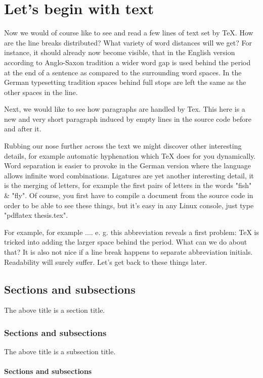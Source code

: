\chapter{Let's begin with text}%
Now we would of course like to see and read a few lines of text set by TeX. How are the line breaks distributed? What variety of word distances will we get? For instance, it should already now become visible, that in the English version according to Anglo-Saxon tradition a wider word gap is used behind the period at the end of a sentence as compared to the surrounding word spaces. In the German typesetting tradition spaces behind full stops are left the same as the other spaces in the line.

Next, we would like to see how paragraphs are handled by Tex. This here is a new and very short paragraph induced by empty lines in the source code before and after it.

Rubbing our nose further across the text we might discover other interesting details, for example automatic hyphenation which TeX does for you dynamically. Word separation is easier to provoke in the German version where the language allows infinite word combinations. Ligatures are yet another interesting detail, it is the merging of letters, for example the first pairs of letters in the words "fish" \& "fly". Of course, you first have to compile a document from the source code in order to be able to see these things, but it's easy in any Linux console, just type "pdflatex thesis.tex".

For example, for example .... e. g. this abbreviation reveals a first problem: TeX is tricked into adding the larger space behind the period. What can we do about that? It is also not nice if a line break happens to separate abbreviation initials. Readability will surely suffer. Let's get back to these things later.

\section{Sections and subsections}

The above title is a section title.

\subsection{Sections and subsections}

The above title is a subsection title.

\subsubsection{Sections and subsections}

